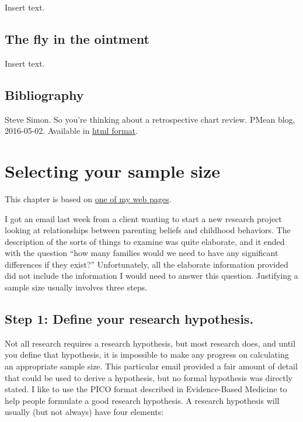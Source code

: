 \documentclass[
  letterpaper,
  DIV=11,
  numbers=noendperiod]{scrreprt}
\begin{document}
Insert text.

\section{The fly in the ointment}\label{the-fly-in-the-ointment-1}

Insert text.

\section{Bibliography}\label{bibliography-1}

Steve Simon. So you're thinking about a retrospective chart review.
PMean blog, 2016-05-02. Available in
\href{http://blog.pmean.com/chart-review/}{html format}.


\chapter{Selecting your sample size}\label{selecting-your-sample-size}

This chapter is based on
\href{http://www.new.pmean.com/chapter-sample-size/}{one of my web
pages}.

I got an email last week from a client wanting to start a new research
project looking at relationships between parenting beliefs and childhood
behaviors. The description of the sorts of things to examine was quite
elaborate, and it ended with the question ``how many families would we
need to have any significant differences if they exist?'' Unfortunately,
all the elaborate information provided did not include the information I
would need to answer this question. Justifying a sample size usually
involves three steps.

\section{Step 1: Define your research
hypothesis.}\label{step-1-define-your-research-hypothesis.}

Not all research requires a research hypothesis, but most research does,
and until you define that hypothesis, it is impossible to make any
progress on calculating an appropriate sample size. This particular
email provided a fair amount of detail that could be used to derive a
hypothesis, but no formal hypothesis was directly stated. I like to use
the PICO format described in Evidence-Based Medicine to help people
formulate a good research hypothesis. A research hypothesis will usually
(but not always) have four elements:
\end{document}

